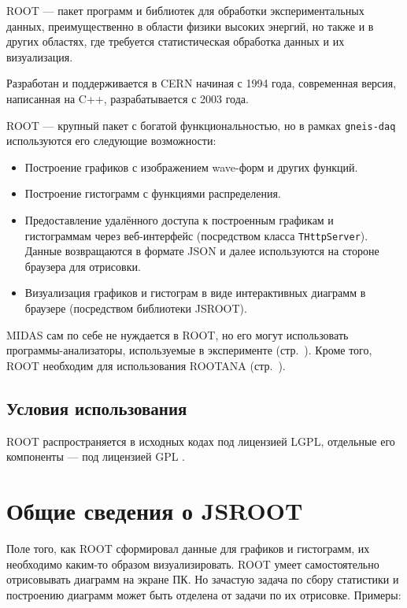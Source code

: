 \documentclass[12pt, a4paper, oneside, onecolumn]{book}
\newcommand{\GD}{{\tt gneis-daq}}
\newcommand{\MIDAS}{\mbox{MIDAS}}
\newcommand{\ROOT}{\mbox{ROOT}}
\newcommand{\ROOTJS}{\mbox{JSROOT}}
\newcommand{\ROOTANA}{\mbox{ROOTANA}}
\newcommand{\CPPCLASS}[1]{\mbox{\tt #1}}
\begin{document}
\ROOT{} \cite{RootHome} --- пакет программ и библиотек для обработки экспериментальных данных, преимущественно в области физики высоких энергий, но также и в других областях, где требуется статистическая обработка данных и их визуализация.

Разработан и поддерживается в CERN начиная с 1994 года, современная версия, написанная на C++, разрабатывается с 2003 года.

\ROOT{} --- крупный пакет с богатой функциональностью, но в рамках \GD{} используются его следующие возможности:

\begin{itemize}
\item Построение графиков с изображением wave-форм и других функций.
\item Построение гистограмм с функциями распределения.
\item Предоставление удалённого доступа к построенным графикам и гистограммам через веб-интерфейс (посредством класса \CPPCLASS{THttpServer}). Данные возвращаются в формате JSON и далее используются на стороне браузера для отрисовки.
\item Визуализация графиков и гистограм в виде интерактивных диаграмм в браузере (посредством библиотеки \ROOTJS{}).
\end{itemize}

\MIDAS{} сам по себе не нуждается в \ROOT{}, но его могут использовать программы-анализаторы, используемые в эксперименте (стр.~\pageref{sec-midas-analyzer}). Кроме того, \ROOT{} необходим для использования \ROOTANA{} (стр.~\pageref{sec-rootana}).

\subsection{Условия использования}

\ROOT{} распространяется в исходных кодах под лицензией LGPL, отдельные его компоненты --- под лицензией GPL \cite{RootLicense}.

\section{Общие сведения о \ROOTJS{}}

Поле того, как \ROOT{} сформировал данные для графиков и гистограмм, их необходимо каким-то образом визуализировать. \ROOT{} умеет самостоятельно отрисовывать диаграмм на экране ПК. Но зачастую задача по сбору статистики и построению диаграмм может быть отделена от задачи по их отрисовке. Примеры:
\end{document}
